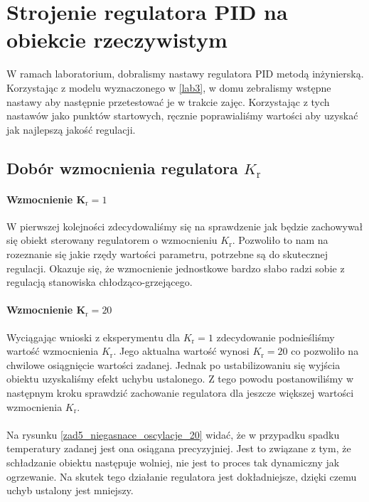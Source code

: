 \chapter{Strojenie regulatora PID na obiekcie rzeczywistym}
\label{lab5_pid}

W ramach laboratorium, dobralismy nastawy regulatora PID metodą inżynierską.
Korzystając z modelu wyznaczonego w \ref{lab3}, w domu zebralismy wstępne nastawy
aby następnie przetestować je w trakcie zajęc. Korzystając z tych nastawów 
jako punktów startowych, ręcznie poprawialiśmy wartości aby uzyskać jak 
najlepszą jakość regulacji.

\section{Dobór wzmocnienia regulatora $K_{\mathrm{r}}$}

\subsubsection{Wzmocnienie $\mathbf{K_{\mathrm{r}}} = \num{1}$}
\label{lab_1}
W pierwszej kolejności zdecydowaliśmy się na sprawdzenie jak będzie zachowywał się
obiekt sterowany regulatorem o wzmocnieniu $K_{\mathrm{r}}$. Pozwoliło to nam
na rozeznanie się jakie rzędy wartości parametru, potrzebne są do skutecznej
regulacji. Okazuje się, że wzmocnienie jednostkowe bardzo słabo radzi sobie
z regulacją stanowiska chłodząco-grzejącego. 

\subsubsection{Wzmocnienie $\mathbf{K_{\mathrm{r}}} = \num{20}$}
\label{zad5_Kr20}
Wyciągając wnioski z eksperymentu dla $K_{\mathrm{r}} = \num{1}$ zdecydowanie podnieśliśmy wartość wzmocnienia $K_{\mathrm{r}}$. Jego aktualna wartość wynosi $K_{\mathrm{r}} = \num{20}$ co pozwoliło na chwilowe osiągnięcie wartości zadanej. Jednak po ustabilizowaniu się wyjścia obiektu uzyskaliśmy efekt uchybu ustalonego. Z tego powodu postanowiliśmy w następnym kroku sprawdzić zachowanie regulatora dla jeszcze większej wartości wzmocnienia $K_{\mathrm{r}}$. 
\\\\Na rysunku \ref{zad5_niegasnace_oscylacje_20} widać, że w przypadku spadku temperatury zadanej jest ona osiągana precyzyjniej. Jest to związane z tym, że schładzanie obiektu następuje wolniej, nie jest to proces tak dynamiczny jak ogrzewanie. Na skutek tego działanie regulatora jest dokładniejsze, dzięki czemu uchyb ustalony jest mniejszy.

